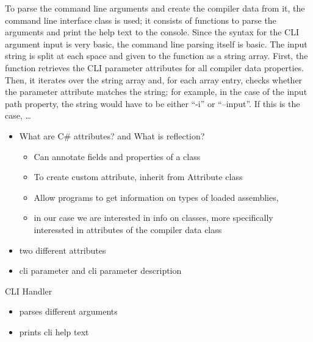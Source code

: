 To parse the command line arguments and create the compiler data from it, the command line interface class is used; it consists of functions to parse the arguments and print the help text to the console. Since the syntax for the CLI argument input is very basic, the command line parsing itself is basic. The input string is split at each space and given to the function as a string array. First, the function retrieves the CLI parameter attributes for all compiler data properties. Then, it iterates over the string array and, for each array entry, checks whether the parameter attribute matches the string; for example, in the case of the input path property, the string would have to be either ``-i'' or ``--input''. If this is the case, \dots
\begin{itemize}
    \item What are C\# attributes? and What is reflection?
    \begin{itemize}
        \item Can annotate fields and properties of a class
        \item To create custom attribute, inherit from Attribute class
        \item Allow programs to get information on types of loaded assemblies, 
        \item in our case we are interested in info on classes, more specifically interessted in attributes of the compiler data class  
    \end{itemize}
    \item two different attributes
    \item cli parameter and cli parameter description
\end{itemize}

CLI Handler
\begin{itemize}
    \item parses different arguments
    \item prints cli help text
\end{itemize}
